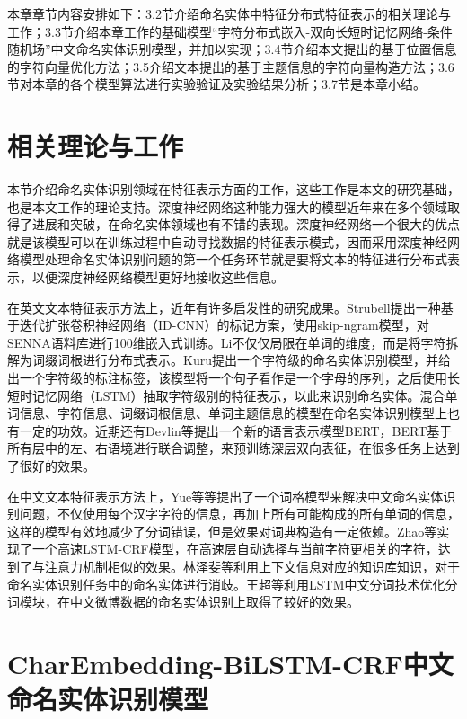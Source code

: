 \documentclass[winfonts,master,oneside,nobackinfo]{njuthesis}
\begin{document}
本章章节内容安排如下：3.2节介绍命名实体中特征分布式特征表示的相关理论与工作；3.3节介绍本章工作的基础模型“字符分布式嵌入-双向长短时记忆网络-条件随机场”中文命名实体识别模型，并加以实现；3.4节介绍本文提出的基于位置信息的字符向量优化方法；3.5介绍文本提出的基于主题信息的字符向量构造方法；3.6节对本章的各个模型算法进行实验验证及实验结果分析；3.7节是本章小结。

\section{相关理论与工作}

本节介绍命名实体识别领域在特征表示方面的工作，这些工作是本文的研究基础，也是本文工作的理论支持。深度神经网络这种能力强大的模型近年来在多个领域取得了进展和突破，在命名实体领域也有不错的表现。深度神经网络一个很大的优点就是该模型可以在训练过程中自动寻找数据的特征表示模式，因而采用深度神经网络模型处理命名实体识别问题的第一个任务环节就是要将文本的特征进行分布式表示，以便深度神经网络模型更好地接收这些信息。

在英文文本特征表示方法上，近年有许多启发性的研究成果。Strubell\cite{Strubell}提出一种基于迭代扩张卷积神经网络（ID-CNN）的标记方案，使用skip-ngram模型，对SENNA语料库进行100维嵌入式训练。Li\cite{JLi}不仅仅局限在单词的维度，而是将字符拆解为词缀词根进行分布式表示。Kuru\cite{Kuru}提出一个字符级的命名实体识别模型，并给出一个字符级的标注标签，该模型将一个句子看作是一个字母的序列，之后使用长短时记忆网络（LSTM）抽取字符级别的特征表示，以此来识别命名实体。混合单词信息、字符信息、词缀词根信息、单词主题信息的模型\cite{Strubell,Jansson,Wei}在命名实体识别模型上也有一定的功效。近期还有Devlin等\cite{Devlin}提出一个新的语言表示模型BERT，BERT基于所有层中的左、右语境进行联合调整，来预训练深层双向表征，在很多任务上达到了很好的效果。

在中文文本特征表示方法上，Yue等\cite{Yue}等提出了一个词格模型来解决中文命名实体识别问题，不仅使用每个汉字字符的信息，再加上所有可能构成的所有单词的信息，这样的模型有效地减少了分词错误，但是效果对词典构造有一定依赖。Zhao等\cite{Zhao}实现了一个高速LSTM-CRF模型，在高速层自动选择与当前字符更相关的字符，达到了与注意力机制相似的效果。林泽斐等\cite{lzf}利用上下文信息对应的知识库知识，对于命名实体识别任务中的命名实体进行消歧。王超等\cite{Wang}利用LSTM中文分词技术优化分词模块，在中文微博数据的命名实体识别上取得了较好的效果。

\section{CharEmbedding-BiLSTM-CRF中文命名实体识别模型}
\end{document}
